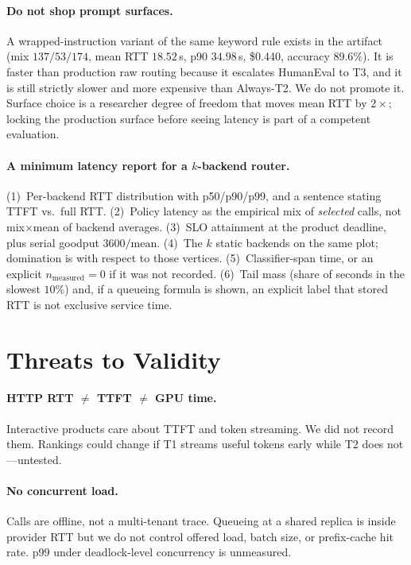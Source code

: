 \documentclass[10pt,conference]{IEEEtran}
\begin{document}
\paragraph{Do not shop prompt surfaces.}
A wrapped-instruction variant of the same keyword rule exists in the artifact (mix $137/53/174$, mean RTT $18.52$\,s, p90 $34.98$\,s, \$0.440, accuracy $89.6\%$). It is faster than production raw routing because it escalates HumanEval to T3, and it is still strictly slower and more expensive than Always-T2. We do not promote it. Surface choice is a researcher degree of freedom that moves mean RTT by $2\times$; locking the production surface before seeing latency is part of a competent evaluation.

\paragraph{A minimum latency report for a $k$-backend router.}
(1)~Per-backend RTT distribution with p50/p90/p99, and a sentence stating TTFT vs.\ full RTT.
(2)~Policy latency as the empirical mix of \emph{selected} calls, not mix$\times$mean of backend averages.
(3)~SLO attainment at the product deadline, plus serial goodput $3600/\mathrm{mean}$.
(4)~The $k$ static backends on the same plot; domination is with respect to those vertices.
(5)~Classifier-span time, or an explicit $n_{\mathrm{measured}}=0$ if it was not recorded.
(6)~Tail mass (share of seconds in the slowest $10\%$) and, if a queueing formula is shown, an explicit label that stored RTT is not exclusive service time.

\section{Threats to Validity}
\label{sec:threats}

\paragraph{HTTP RTT $\neq$ TTFT $\neq$ GPU time.}
Interactive products care about TTFT and token streaming. We did not record them. Rankings could change if T1 streams useful tokens early while T2 does not---untested.

\paragraph{No concurrent load.}
Calls are offline, not a multi-tenant trace. Queueing at a shared replica is inside provider RTT but we do not control offered load, batch size, or prefix-cache hit rate. p99 under deadlock-level concurrency is unmeasured.
\end{document}
